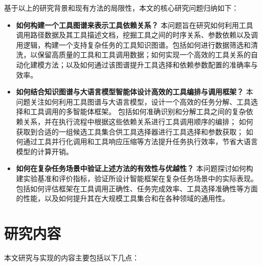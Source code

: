 基于以上的研究背景和现有方法的局限性，本文的核心研究问题归纳如下：
\begin{itemize}
    \item \textbf{如何构建一个工具图谱来表示工具依赖关系？}  
    本问题旨在研究如何利用工具调用路径数据及其工具描述文档，挖掘工具之间的时序关系、参数依赖以及调用逻辑，构建一个支持复杂任务的工具知识图谱。包括如何进行数据筛选和清洗，以保留高质量的工具和工具调用数据；如何实现一个高效的工具关系的自动化建模方法；以及如何通过该图谱提升工具选择和依赖参数配置的准确率与效率。
    
    \item \textbf{如何结合知识图谱与大语言模型智能体设计高效的工具编排与调用框架？}  
    本问题关注如何利用工具图谱与大语言模型，设计一个高效的任务分解、工具选择和工具调用的多智能体框架。
    包括如何准确识别和分解工具之间的复杂依赖关系，并在执行流程中根据这些依赖关系进行工具调用顺序的编排；
    如何获取到合适的一组候选工具集合供工具选择器进行工具选择和参数获取；
    如何通过工具并行化调用和工具响应压缩等方法提升任务执行效率，节省大语言模型的计算开销。
    
    \item \textbf{如何在复杂任务场景中验证上述方法的有效性与优越性？}  
    本问题探讨如何构建实验基准和评价指标，验证所设计智能框架在复杂任务场景中的实际表现。包括如何评估框架在工具调用正确性、任务完成效率、工具选择准确性等方面的性能，以及如何提升其在大规模工具集合和在各种领域的通用性。
\end{itemize}

\section{研究内容}

本文研究与实现的内容主要包括以下几点：

